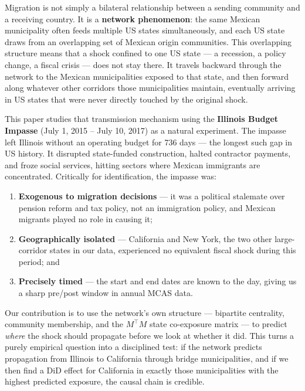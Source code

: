\documentclass[
  11pt,
  letterpaper,
  DIV=11,
  numbers=noendperiod]{scrartcl}
\providecommand{\tightlist}{%
  \setlength{\itemsep}{0pt}\setlength{\parskip}{0pt}}
\begin{document}
Migration is not simply a bilateral relationship between a sending
community and a receiving country. It is a \textbf{network phenomenon}:
the same Mexican municipality often feeds multiple US states
simultaneously, and each US state draws from an overlapping set of
Mexican origin communities. This overlapping structure means that a
shock confined to one US state --- a recession, a policy change, a
fiscal crisis --- does not stay there. It travels backward through the
network to the Mexican municipalities exposed to that state, and then
forward along whatever other corridors those municipalities maintain,
eventually arriving in US states that were never directly touched by the
original shock.

This paper studies that transmission mechanism using the
\textbf{Illinois Budget Impasse} (July 1, 2015 -- July 10, 2017) as a
natural experiment. The impasse left Illinois without an operating
budget for 736 days --- the longest such gap in US history. It disrupted
state-funded construction, halted contractor payments, and froze social
services, hitting sectors where Mexican immigrants are concentrated.
Critically for identification, the impasse was:

\begin{enumerate}
\def\labelenumi{\arabic{enumi}.}
\tightlist
\item
  \textbf{Exogenous to migration decisions} --- it was a political
  stalemate over pension reform and tax policy, not an immigration
  policy, and Mexican migrants played no role in causing it;
\item
  \textbf{Geographically isolated} --- California and New York, the two
  other large-corridor states in our data, experienced no equivalent
  fiscal shock during this period; and
\item
  \textbf{Precisely timed} --- the start and end dates are known to the
  day, giving us a sharp pre/post window in annual MCAS data.
\end{enumerate}

Our contribution is to use the network's own structure --- bipartite
centrality, community membership, and the \(M^\top M\) state co-exposure
matrix --- to predict \emph{where} the shock should propagate before we
look at whether it did. This turns a purely empirical question into a
disciplined test: if the network predicts propagation from Illinois to
California through bridge municipalities, and if we then find a DiD
effect for California in exactly those municipalities with the highest
predicted exposure, the causal chain is credible.
\end{document}
